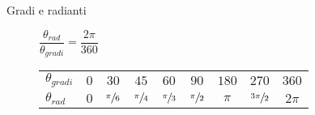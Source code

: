 \documentclass[a4paper,11pt,italian]{article}
\begin{document}
\begin{description}
%

  \item[Gradi e radianti] %
$ \dfrac{\theta_{rad}}{\theta_{gradi}} = \dfrac{2\pi}{360} $
  \begin{table}[htp]\centering
    \begin{tabular}{lcccccccc}\toprule
        \boldmath$ \theta_{gradi} $ & $ 0 $ & $ 30 $ & $ 45 $ & $ 60 $ & $ 90 $ & $ 180 $ & $ 270 $ & $ 360 $\\\addlinespace[.2em]\midrule
        \boldmath$ \theta_{rad} $ & $ 0 $ & $ \sfrac{\pi}{6} $ & $ \sfrac{\pi}{4} $ & $ \sfrac{\pi}{3} $ & $ \sfrac{\pi}{2} $ & $ \pi $ & $ \sfrac{3\pi}{2} $ & $ 2\pi $\\\bottomrule
    \end{tabular}
  \end{table}
\end{description}
\end{document}
